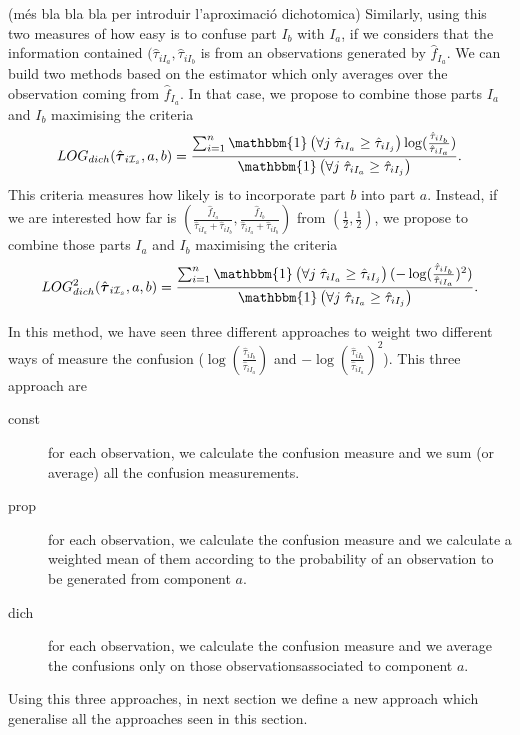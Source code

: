 \documentclass[10pt, a4paper]{article}
\newcommand{\m}[1]{\boldsymbol{#1}}
\begin{document}
{\color{red} (més bla bla bla per introduir l'aproximació dichotomica)} Similarly, using this two measures of how easy is to confuse part $I_b$ with $I_a$, if we considers that the information contained $(\hat{\tau}_{iI_a}, \hat{\tau}_{iI_b}$ is from an observations generated by $\hat{f}_{I_a}$. We can build two methods based on the estimator which only averages over the observation coming from $\hat{f}_{I_a}$. In that case, we propose to combine those parts $I_a$ and $I_b$ maximising the criteria
\[
LOG_{dich}( \hat{\m \tau}_{i \mathcal{I}_s}, a, b) = \frac{ \sum_{i=1}^n  \mathbbm{1}\left( \forall j\; \hat{\tau}_{i I_{a}} \geq \hat{\tau}_{iI_j} \right) \log (\frac{ \hat{\tau}_{iI_b} }{ \hat{\tau}_{iI_a} })}{\mathbbm{1}\left( \forall j\; \hat{\tau}_{i I_{a}} \geq \hat{\tau}_{iI_j} \right)}.
\]
This criteria measures how likely is to incorporate part $b$ into part $a$. Instead, if we are interested how far is $(\frac{\hat{f}_{I_a}}{\hat{\tau}_{iI_a} + \hat{\tau}_{iI_b}}, \frac{\hat{f}_{I_b}}{\hat{\tau}_{iI_a} + \hat{\tau}_{iI_b}})$ from $(\frac{1}{2}, \frac{1}{2})$, we propose to combine those parts $I_a$ and $I_b$ maximising the criteria
\[
LOG^2_{dich}( \hat{\m \tau}_{i \mathcal{I}_s}, a, b) = \frac{ \sum_{i=1}^n \mathbbm{1}\left( \forall j\; \hat{\tau}_{i I_{a}} \geq \hat{\tau}_{iI_j} \right) (-\log (\frac{ \hat{\tau}_{iI_b} }{ \hat{\tau}_{iI_a} })^2)}{\mathbbm{1}\left( \forall j\; \hat{\tau}_{i I_{a}} \geq \hat{\tau}_{iI_j} \right)}.
\]


In this method, we have seen three different approaches to weight two different ways of measure the confusion ($\log (\frac{ \hat{\tau}_{iI_b} }{ \hat{\tau}_{iI_a} })$ and $-\log (\frac{ \hat{\tau}_{iI_b} }{ \hat{\tau}_{iI_a} })^2$). This three approach are
\begin{description}
\item[const] for each observation, we calculate the confusion measure and we sum (or average) all the confusion measurements.
\item[prop] for each observation, we calculate the confusion measure and we calculate a weighted mean of them according to the probability of an observation to be generated from component $a$.
\item[dich] for each observation, we calculate the confusion measure and we average the confusions only on those observationsassociated to component $a$.
\end{description}

Using this three approaches, in next section we define a new approach which generalise all the approaches seen in this section.
\end{document}
